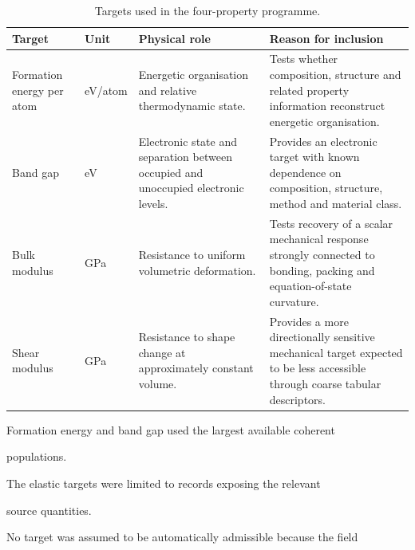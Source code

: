 \documentclass[11pt,a4paper,oneside]{report}
\begin{document}
\begin{table}[H]



\centering



\caption{Targets used in the four-property programme.}



\label{tab:targets}



\begin{tabularx}{\textwidth}{L{0.20\textwidth}
    L{0.19\textwidth}
    Y
    Y
}
\toprule
\textbf{Target}
&
\textbf{Unit}
&
\textbf{Physical role}
&
\textbf{Reason for inclusion}
\\
\midrule
Formation energy per atom
&
eV/atom
&
Energetic organisation and relative thermodynamic state.
&
Tests whether composition,
structure
and related property information reconstruct energetic organisation.
\\
\addlinespace
Band gap
&
eV
&
Electronic state and separation between occupied and unoccupied
electronic levels.
&
Provides an electronic target with known dependence on composition,
structure,
method
and material class.
\\
\addlinespace
Bulk modulus
&
GPa
&
Resistance to uniform volumetric deformation.
&
Tests recovery of a scalar mechanical response strongly connected to
bonding,
packing
and equation-of-state curvature.
\\
\addlinespace
Shear modulus
&
GPa
&
Resistance to shape change at approximately constant volume.
&
Provides a more directionally sensitive mechanical target expected to
be less accessible through coarse tabular descriptors.
\\
\bottomrule
\end{tabularx}



\end{table}





Formation energy and band gap used the largest available coherent

populations.



The elastic targets were limited to records exposing the relevant

source quantities.



No target was assumed to be automatically admissible because the field
\end{document}
